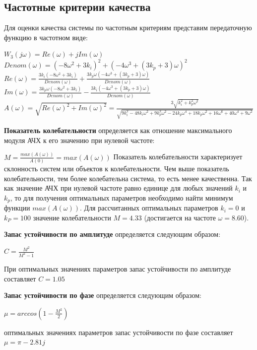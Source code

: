 \subsection{Частотные критерии качества}

Для оценки качества системы по частотным критериям представим передаточную функцию в частотном виде:

\noindent$W_3(j\omega)= Re(\omega)+ j Im(\omega)$\\
$Denom(\omega) = (- 8\omega^2 + 3k_i)^2 + (- 4\omega^3 + (3k_p + 3)\omega)^2$\\
$Re(\omega) = \frac{3k_i(- 8\omega^2 + 3k_i)}{Denom(\omega)} + \frac{3k_p\omega(- 4\omega^3 + (3k_p + 3)\omega)}{Denom(\omega)}$\\
$Im(\omega) = \frac{3k_p\omega(- 8\omega^2 + 3k_i)}{Denom(\omega)} - \frac{3k_i(- 4\omega^3 + (3k_p + 3)\omega)}{Denom(\omega)}$\\
$A(\omega) = \sqrt{Re(\omega)^2 + Im(\omega)^2} = 
\frac{3\sqrt{k_i^2 + k_p^2\omega^2}}{\sqrt{9k_i^2 - 48k_i\omega^2 + 9k_p^2\omega^2 - 24k_p\omega^4 + 18k_p\omega^2 + 16\omega^6 + 40\omega^4 + 9\omega^2}}$

\textbf{Показатель колебательности} определяется как отношение максимального модуля АЧХ к его значению при нулевой частоте:

$M=\frac{max(A(\omega))}{A(0)} = max(A(\omega))$
Показатель колебательности характеризует склонность систем или объектов к колебательности. Чем выше показатель колебательности, тем более колебательна система, то есть менее
качественна.
Так как значение АЧХ при нулевой частоте равно единице для любых значений $k_i$ и $k_p$, то 
для получения оптимальных параметров необходимо найти минимум функции $max(A(\omega))$. 
Для рассчитанных оптимальных параметров $k_i = 0$ и $k_P = 100$ значение колебательности $M = 4.33$ (достигается на частоте $\omega = 8.60$).

\textbf{Запас устойчивости по амплитуде} определяется следующим образом:

$C=\frac{M^2}{M^2-1}$

При оптимальных значениях параметров запас устойчивости по амплитуде составляет $C = 1.05$

\textbf{Запас устойчивости по фазе} определяется следующим образом:

$\mu=arccos(1-\frac{M^2}{2})$

 оптимальных значениях параметров запас устойчивости по фазе составляет\\ $\mu = \pi - 2.81j$

